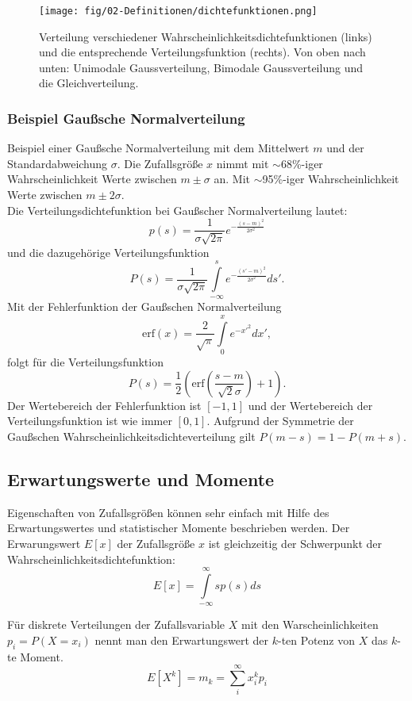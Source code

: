 \begin{figure}
\centering
\texttt{[image: fig/02-Definitionen/dichtefunktionen.png]}
\caption{Verteilung verschiedener Wahrscheinlichkeitsdichtefunktionen (links) und die entsprechende Verteilungsfunktion (rechts). Von oben nach unten: Unimodale Gaussverteilung, Bimodale Gaussverteilung und die Gleichverteilung.}
\label{fig:stoch_distribution}
\end{figure}

\subsubsection*{Beispiel Gaußsche Normalverteilung}
Beispiel einer Gaußsche Normalverteilung mit dem Mittelwert $m$ und der Standardabweichung $\sigma$. Die Zufallsgröße $x$ nimmt mit $\sim$68\%-iger Wahrscheinlichkeit Werte zwischen $m \pm \sigma$ an. Mit $\sim$95\%-iger Wahrscheinlichkeit Werte zwischen $m \pm 2\sigma$.\\
Die Verteilungsdichtefunktion bei Gaußscher Normalverteilung lautet:
\begin{equation}
p(s)=\frac{1}{\sigma \sqrt{2\pi}}e^{-\frac{(s-m)^2}{2\sigma^2}}
\end{equation}
und die dazugehörige Verteilungsfunktion
\[
P(s)=\frac{1}{\sigma \sqrt{2\pi}}\int\limits_{-\infty}^s e^{{-\frac{(s'-m)^2}{2\sigma^2}}}ds'.
\]
Mit der Fehlerfunktion der Gaußschen Normalverteilung
\[
\mbox{erf}(x)=\frac{2}{\sqrt{\pi}}\int\limits_0^x e^{-x'^2}dx',
\]
folgt für die Verteilungsfunktion
\[
P(s) = \frac{1}{2} \left( \mbox{erf}\left(\frac{s-m}{\sqrt{2} \sigma} \right) + 1\right).
\]
Der Wertebereich der Fehlerfunktion ist $[-1,1]$ und der Wertebereich der Verteilungsfunktion ist wie immer $[0,1]$. Aufgrund der Symmetrie der Gaußschen Wahrscheinlichkeitsdichteverteilung gilt $P(m-s) = 1 - P(m+s)$.

\subsection{Erwartungswerte und Momente}
Eigenschaften von Zufallsgrößen können sehr einfach mit Hilfe des Erwartungswertes und statistischer Momente beschrieben werden. Der Erwarungswert $E[x]$ der Zufallsgröße $x$ ist gleichzeitig der Schwerpunkt der Wahrscheinlichkeitsdichtefunktion:
\begin{equation}
E[x] = \int\limits_{-\infty}^{\infty}sp(s)ds
\end{equation}

Für diskrete Verteilungen der Zufallsvariable $X$ mit den Warscheinlichkeiten $p_i=P(X=x_i)$ nennt man den Erwartungswert der $k$-ten Potenz von $X$ das $k$-te Moment.
\begin{equation}
E[X^k]=m_k=\sum \limits_{i}^{\infty}x_i^k p_i
\end{equation}

